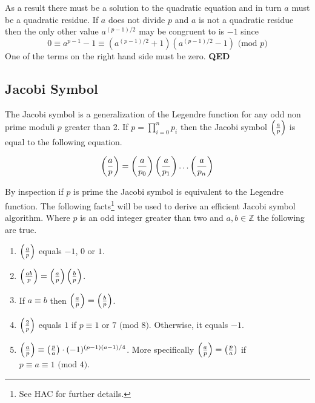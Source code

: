 \documentclass[b5paper]{book}
\def\Z{{\mathbb Z}}
\begin{document}
As a result there must be a solution to the quadratic equation and in turn $a$ must be a quadratic residue.  If $a$ does not divide $p$ and $a$
is not a quadratic residue then the only other value $a^{(p-1)/2}$ may be congruent to is $-1$ since
\begin{equation}
0 \equiv a^{p - 1} - 1 \equiv (a^{(p-1)/2} + 1)(a^{(p-1)/2} - 1) \mbox{ (mod }p\mbox{)}
\end{equation}
One of the terms on the right hand side must be zero.  \textbf{QED}

\subsection{Jacobi Symbol}
The Jacobi symbol is a generalization of the Legendre function for any odd non prime moduli $p$ greater than 2.  If $p = \prod_{i=0}^n p_i$ then
the Jacobi symbol $\left ( { a \over p } \right )$ is equal to the following equation.

\begin{equation}
\left ( { a \over p } \right ) = \left ( { a \over p_0} \right ) \left ( { a \over p_1} \right ) \ldots \left ( { a \over p_n} \right )
\end{equation}

By inspection if $p$ is prime the Jacobi symbol is equivalent to the Legendre function.  The following facts\footnote{See HAC \cite[pp. 72-74]{HAC} for
further details.} will be used to derive an efficient Jacobi symbol algorithm.  Where $p$ is an odd integer greater than two and $a, b \in \Z$ the
following are true.  

\begin{enumerate}
\item $\left ( { a \over p} \right )$ equals $-1$, $0$ or $1$. 
\item $\left ( { ab \over p} \right ) = \left ( { a \over p} \right )\left ( { b \over p} \right )$.
\item If $a \equiv b$ then $\left ( { a \over p} \right ) = \left ( { b \over p} \right )$.
\item $\left ( { 2 \over p} \right )$ equals $1$ if $p \equiv 1$ or $7 \mbox{ (mod }8\mbox{)}$.  Otherwise, it equals $-1$.
\item $\left ( { a \over p} \right ) \equiv \left ( { p \over a} \right ) \cdot (-1)^{(p-1)(a-1)/4}$.  More specifically 
$\left ( { a \over p} \right ) = \left ( { p \over a} \right )$ if $p \equiv a \equiv 1 \mbox{ (mod }4\mbox{)}$.  
\end{enumerate}
\end{document}
